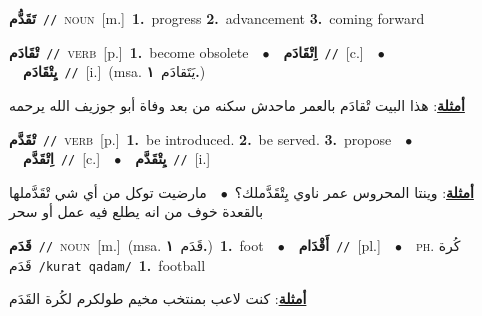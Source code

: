 \documentclass[10pt,a4paper,twoside]{article} %
\begin{document}
\begin{multicols}{2}
{\setlength\topsep{0pt}\textbf{\foreignlanguage{arabic}{تَقَدُّم}}\ {\color{gray}\texttt{//}\color{black}}\ \textsc{noun}\ [m.]\ \textbf{1.}~progress  \textbf{2.}~advancement  \textbf{3.}~coming forward\ } \vspace{2mm}

{\setlength\topsep{0pt}\textbf{\foreignlanguage{arabic}{تْقَادَم}}\ {\color{gray}\texttt{//}\color{black}}\ \textsc{verb}\ [p.]\ \textbf{1.}~become obsolete\ \ $\bullet$\ \ \setlength\topsep{0pt}\textbf{\foreignlanguage{arabic}{اِتْقَادَم}}\ {\color{gray}\texttt{//}\color{black}}\ [c.]\ \ $\bullet$\ \ \setlength\topsep{0pt}\textbf{\foreignlanguage{arabic}{يِتْقَادَم}}\ {\color{gray}\texttt{//}\color{black}}\ [i.]\ \color{gray}(msa. \foreignlanguage{arabic}{يَتَقادَم}~\foreignlanguage{arabic}{\textbf{١.}})\color{black}\  \begin{flushright}\color{gray}\foreignlanguage{arabic}{\textbf{\underline{\foreignlanguage{arabic}{أمثلة}}}: هذا البيت تْقادَم بالعمر ماحدش سكنه من بعد وفاة أبو جوزيف الله يرحمه}\end{flushright}\color{black}} \vspace{2mm}

{\setlength\topsep{0pt}\textbf{\foreignlanguage{arabic}{تْقَدَّم}}\ {\color{gray}\texttt{//}\color{black}}\ \textsc{verb}\ [p.]\ \textbf{1.}~be introduced.  \textbf{2.}~be served.  \textbf{3.}~propose\ \ $\bullet$\ \ \setlength\topsep{0pt}\textbf{\foreignlanguage{arabic}{اِتْقَدَّم}}\ {\color{gray}\texttt{//}\color{black}}\ [c.]\ \ $\bullet$\ \ \setlength\topsep{0pt}\textbf{\foreignlanguage{arabic}{يِتْقَدَّم}}\ {\color{gray}\texttt{//}\color{black}}\ [i.]\  \begin{flushright}\color{gray}\foreignlanguage{arabic}{\textbf{\underline{\foreignlanguage{arabic}{أمثلة}}}: وينتا المحروس عمر ناوي يِتْقَدَّملك؟\ $\bullet$\ \  مارضيت توكل من أي شي تْقَدَّملها بالقعدة خوف من انه يطلع فيه عمل أو سحر}\end{flushright}\color{black}} \vspace{2mm}

{\setlength\topsep{0pt}\textbf{\foreignlanguage{arabic}{قَدَم}}\ {\color{gray}\texttt{//}\color{black}}\ \textsc{noun}\ [m.]\ \color{gray}(msa. \foreignlanguage{arabic}{قَدَم}~\foreignlanguage{arabic}{\textbf{١.}})\color{black}\ \textbf{1.}~foot\ \ $\bullet$\ \ \setlength\topsep{0pt}\textbf{\foreignlanguage{arabic}{أَقْدَام}}\ {\color{gray}\texttt{//}\color{black}}\ [pl.]\ \ $\bullet$\ \ \textsc{ph.} \color{gray} \foreignlanguage{arabic}{كُرة قَدَم}\color{black}\ {\color{gray}\texttt{/{\sffamily kurat qadam}/}\color{black}}\ \textbf{1.}~football\  \begin{flushright}\color{gray}\foreignlanguage{arabic}{\textbf{\underline{\foreignlanguage{arabic}{أمثلة}}}: كنت لاعب بمنتخب مخيم طولكرم لكُرة القَدَم}\end{flushright}\color{black}} \vspace{2mm}


\end{multicols}
\end{document}
